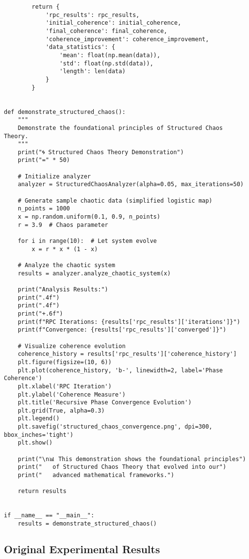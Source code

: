 \documentclass[12pt]{article}
\begin{document}
\begin{lstlisting}
        return {
            'rpc_results': rpc_results,
            'initial_coherence': initial_coherence,
            'final_coherence': final_coherence,
            'coherence_improvement': coherence_improvement,
            'data_statistics': {
                'mean': float(np.mean(data)),
                'std': float(np.std(data)),
                'length': len(data)
            }
        }


def demonstrate_structured_chaos():
    """
    Demonstrate the foundational principles of Structured Chaos Theory.
    """
    print("🌀 Structured Chaos Theory Demonstration")
    print("=" * 50)

    # Initialize analyzer
    analyzer = StructuredChaosAnalyzer(alpha=0.05, max_iterations=50)

    # Generate sample chaotic data (simplified logistic map)
    n_points = 1000
    x = np.random.uniform(0.1, 0.9, n_points)
    r = 3.9  # Chaos parameter

    for i in range(10):  # Let system evolve
        x = r * x * (1 - x)

    # Analyze the chaotic system
    results = analyzer.analyze_chaotic_system(x)

    print("Analysis Results:")
    print(".4f")
    print(".4f")
    print("+.6f")
    print(f"RPC Iterations: {results['rpc_results']['iterations']}")
    print(f"Convergence: {results['rpc_results']['converged']}")

    # Visualize coherence evolution
    coherence_history = results['rpc_results']['coherence_history']
    plt.figure(figsize=(10, 6))
    plt.plot(coherence_history, 'b-', linewidth=2, label='Phase Coherence')
    plt.xlabel('RPC Iteration')
    plt.ylabel('Coherence Measure')
    plt.title('Recursive Phase Convergence Evolution')
    plt.grid(True, alpha=0.3)
    plt.legend()
    plt.savefig('structured_chaos_convergence.png', dpi=300, bbox_inches='tight')
    plt.show()

    print("\n📊 This demonstration shows the foundational principles")
    print("   of Structured Chaos Theory that evolved into our")
    print("   advanced mathematical frameworks.")

    return results


if __name__ == "__main__":
    results = demonstrate_structured_chaos()
\end{lstlisting}

\subsection{Original Experimental Results}
\end{document}
